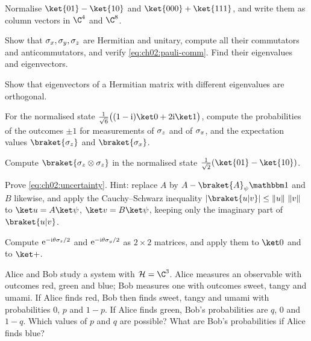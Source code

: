 \documentclass[handoutsbeamer.tex]{subfiles}
\begin{document}
\begin{frame}[allowframebreaks]
\begin{exe}\label{exe:ch02:normalise}
Normalise $\ket{01}-\ket{10}$ and $\ket{000}+\ket{111}$, and write them as column vectors in $\C^4$ and $\C^8$.
\end{exe}
\begin{exe}\label{exe:ch02:pauli}
Show that $\sigma_x,\sigma_y,\sigma_z$ are Hermitian and unitary, compute all their commutators and anticommutators, and verify \eqref{eq:ch02:pauli-comm}. Find their eigenvalues and eigenvectors.
\end{exe}
\begin{exe}
Show that eigenvectors of a Hermitian matrix with different eigenvalues are orthogonal.
\end{exe}
\begin{exe}
For the normalised state $\tfrac1{\sqrt6}\big((1-\imath)\ket0+2\imath\ket1\big)$, compute the probabilities of the outcomes $\pm1$ for measurements of $\sigma_z$ and of $\sigma_x$, and the expectation values $\braket{\sigz}$ and $\braket{\sigx}$.
\end{exe}
\begin{exe}
Compute $\braket{\sigz\otimes\sigz}$ in the normalised state $\tfrac1{\sqrt2}(\ket{01}-\ket{10})$.
\end{exe}
\begin{exe}\label{exe:ch02:uncertainty}
Prove \eqref{eq:ch02:uncertainty}. Hint: replace $A$ by $A-\braket{A}_\psi\Id$ and $B$ likewise, and apply the Cauchy--Schwarz inequality $\abs{\braket{u|v}}\le\norm u\,\norm v$ to $\ket u=A\ket\psi$, $\ket v=B\ket\psi$, keeping only the imaginary part of $\braket{u|v}$.
\end{exe}
\begin{exe}
Compute $\mathrm{e}^{-\mathrm{i}\theta\sigma_z/2}$ and $\mathrm{e}^{-\mathrm{i}\theta\sigma_y/2}$ as $2\times2$ matrices, and apply them to $\ket0$ and to $\ket+$.
\end{exe}
\begin{exe}
Alice and Bob study a system with $\Hil=\C^3$. Alice measures an observable with outcomes red, green and blue; Bob measures one with outcomes sweet, tangy and umami. If Alice finds red, Bob then finds sweet, tangy and umami with probabilities $0$, $p$ and $1-p$. If Alice finds green, Bob's probabilities are $q$, $0$ and $1-q$. Which values of $p$ and $q$ are possible? What are Bob's probabilities if Alice finds blue?
\end{exe}
\end{frame}
\end{document}

